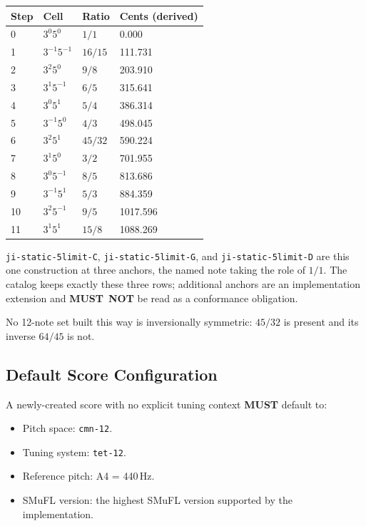 \documentclass[11pt,letterpaper]{report}
\newcommand{\MUST}{\textbf{MUST}}
\newcommand{\MUSTNOT}{\textbf{MUST}\nobreak\ \textbf{NOT}}
\begin{document}
\begin{longtable}{p{1.4cm} p{2.6cm} p{2.2cm} p{3.4cm}}
  \toprule
  \textbf{Step} & \textbf{Cell} & \textbf{Ratio} &
  \textbf{Cents (derived)} \\
  \midrule
  \endhead
  0 & $3^{0}5^{0}$ & $1/1$ & 0.000 \\
  1 & $3^{-1}5^{-1}$ & $16/15$ & 111.731 \\
  2 & $3^{2}5^{0}$ & $9/8$ & 203.910 \\
  3 & $3^{1}5^{-1}$ & $6/5$ & 315.641 \\
  4 & $3^{0}5^{1}$ & $5/4$ & 386.314 \\
  5 & $3^{-1}5^{0}$ & $4/3$ & 498.045 \\
  6 & $3^{2}5^{1}$ & $45/32$ & 590.224 \\
  7 & $3^{1}5^{0}$ & $3/2$ & 701.955 \\
  8 & $3^{0}5^{-1}$ & $8/5$ & 813.686 \\
  9 & $3^{-1}5^{1}$ & $5/3$ & 884.359 \\
  10 & $3^{2}5^{-1}$ & $9/5$ & 1017.596 \\
  11 & $3^{1}5^{1}$ & $15/8$ & 1088.269 \\
  \bottomrule
\end{longtable}

\texttt{ji-static-5limit-C}, \texttt{ji-static-5limit-G}, and
\texttt{ji-static-5limit-D} are this one construction at three anchors,
the named note taking the role of $1/1$. The catalog keeps exactly
these three rows; additional anchors are an implementation extension
and \MUSTNOT{} be read as a conformance obligation.

No 12-note set built this way is inversionally symmetric: $45/32$ is
present and its inverse $64/45$ is not.

\subsection{Default Score Configuration}

A newly-created score with no explicit tuning context \MUST{} default to:

\begin{itemize}
  \item Pitch space: \texttt{cmn-12}.
  \item Tuning system: \texttt{tet-12}.
  \item Reference pitch: A4 = 440\,Hz.
  \item SMuFL version: the highest SMuFL version supported by the
    implementation.
\end{itemize}
\end{document}
